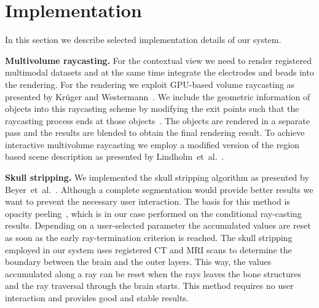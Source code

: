 \documentclass[review]{vgtc}                 %
\begin{document}

\section{Implementation}\label{sec:implementation}
In this section we describe selected implementation details of our system.

\noindent \textbf{Multivolume raycasting.} For the contextual view we need to render registered multimodal datasets and at the same time integrate the electrodes and beads into the rendering. For the rendering we exploit GPU-based volume raycasting as presented by Kr\"uger and Westermann~\cite{kr}. We include the geometric information of objects into this raycasting scheme by modifying the exit points such that the raycasting process ends at those objects~\cite{Scharsach}. The objects are rendered in a separate pass and the results are blended to obtain the final rendering result. To achieve interactive multivolume raycasting we employ a modified version of the region based scene description as presented by Lindholm~et~al.~\cite{Lindholm2009}.

\noindent \textbf{Skull stripping.} We implemented the skull stripping algorithm as presented by Beyer~et~al.~\cite{Beyer2007}. Although a complete segmentation would provide better results we want to prevent the necessary user interaction. The basis for this method is opacity peeling~\cite{Rezk-salama2006}, which is in our case performed on the conditional ray-casting results. Depending on a user-selected parameter the accumulated values are reset as soon as the early ray-termination criterion is reached. The skull stripping employed in our system uses registered CT and MRI scans to determine the boundary between the brain and the outer layers. This way, the values accumulated along a ray can be reset when the rays leaves the bone structures and the ray traversal through the brain starts. This method requires no user interaction and provides good and stable results.
\end{document}

